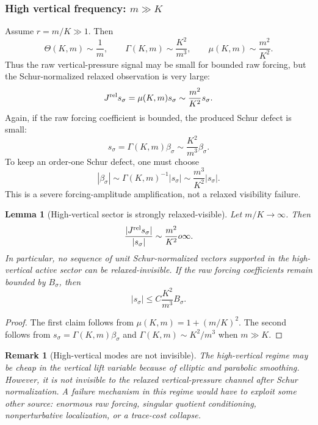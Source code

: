 \documentclass[11pt]{article}
\numberwithin{equation}{section}
\newtheorem{lemma}[theorem]{Lemma}
\newtheorem{remark}[theorem]{Remark}
\begin{document}
\subsubsection*{High vertical frequency: \(m\gg K\)}

Assume \(r=m/K\gg1\).  Then
\[
        \Theta(K,m)\sim \frac1m,
        \qquad
        \Gamma(K,m)\sim \frac{K^2}{m^3},
        \qquad
        \mu(K,m)\sim \frac{m^2}{K^2}.
\]
Thus the raw vertical-pressure signal may be small for bounded raw forcing, but the Schur-normalized relaxed observation is very large:
\[
        J^{\rm rel}s_\sigma
        =\mu(K,m)s_\sigma
        \sim \frac{m^2}{K^2}s_\sigma.
\]
Again, if the raw forcing coefficient is bounded, the produced Schur defect is small:
\[
        s_\sigma=\Gamma(K,m)\beta_\sigma
        \sim \frac{K^2}{m^3}\beta_\sigma.
\]
To keep an order-one Schur defect, one must choose
\[
        |\beta_\sigma|\sim \Gamma(K,m)^{-1}|s_\sigma|
        \sim \frac{m^3}{K^2}|s_\sigma|.
\]
This is a severe forcing-amplitude amplification, not a relaxed visibility failure.

\begin{lemma}[High-vertical sector is strongly relaxed-visible]\label{lem:high-vertical-sector-strongly-visible}
Let \(m/K\to\infty\).  Then
\[
        \frac{|J^{\rm rel}s_\sigma|}{|s_\sigma|}
        \sim
        \frac{m^2}{K^2}	o\infty.
\]
In particular, no sequence of unit Schur-normalized vectors supported in the high-vertical active sector can be relaxed-invisible.  If the raw forcing coefficients remain bounded by \(B_\sigma\), then
\[
        |s_\sigma|\le C\frac{K^2}{m^3}B_\sigma.
\]
\end{lemma}

\begin{proof}
The first claim follows from \(\mu(K,m)=1+(m/K)^2\).  The second follows from \(s_\sigma=\Gamma(K,m)\beta_\sigma\) and \(\Gamma(K,m)\sim K^2/m^3\) when \(m\gg K\).
\end{proof}

\begin{remark}[High-vertical modes are not invisible]
The high-vertical regime may be cheap in the vertical lift variable because of elliptic and parabolic smoothing.  However, it is not invisible to the relaxed vertical-pressure channel after Schur normalization.  A failure mechanism in this regime would have to exploit some other source: enormous raw forcing, singular quotient conditioning, nonperturbative localization, or a trace-cost collapse.
\end{remark}
\end{document}
